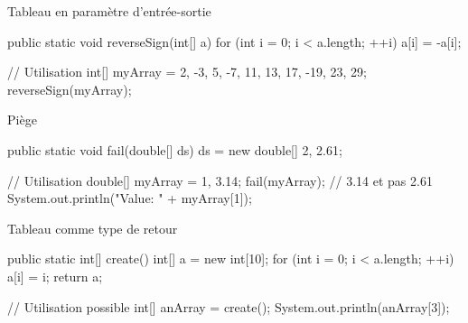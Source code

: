 \begin{frame}[fragile]{Tableau en paramètre d'entrée-sortie}
\begin{java}
public static void reverseSign(int[] a) {
    for (int i = 0; i < a.length; ++i) {
        a[i] = -a[i];
    }
}

// Utilisation
int[] myArray = {2, -3, 5, -7, 11, 13, 17, -19, 23, 29};
reverseSign(myArray);
\end{java}
\end{frame}

\begin{frame}[fragile]{Piège}
\begin{wrong}
\begin{java}
public static void fail(double[] ds){
    ds = new double[] {2, 2.61};
}

// Utilisation
double[] myArray = {1, 3.14};
fail(myArray);
// 3.14 et pas 2.61
System.out.println("Value: " + myArray[1]);
\end{java}
\end{wrong}
\end{frame}

\begin{frame}[fragile]{Tableau comme type de retour}
\begin{java}
public static int[] create(){
    int[] a = new int[10];
    for (int i = 0; i < a.length; ++i){
        a[i] = i;
    }
    return a;
}


// Utilisation possible
int[] anArray = create();
System.out.println(anArray[3]);
\end{java}
\end{frame}



